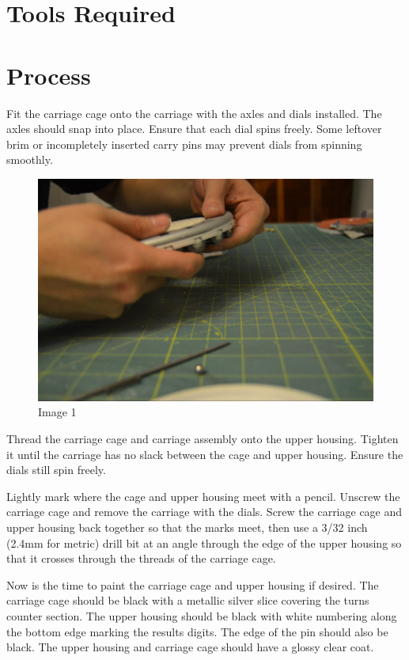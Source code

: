 \documentclass[openany]{book}
\begin{document}
\section{Tools Required}

\section{Process}
Fit the carriage cage onto the carriage with the axles and dials installed. The axles should snap into place. Ensure that each dial spins freely. Some leftover brim or incompletely inserted carry pins may prevent dials from spinning smoothly.


\begin{figure}[!ht]
	\centering
	\includegraphics[width=.75\textwidth]{images/image1.jpg}
	\caption{Image 1}
	\label{fig:image1}	
\end{figure}

Thread the carriage cage and carriage assembly onto the upper housing. Tighten it until the carriage has no slack between the cage and upper housing. Ensure the dials still spin freely.

Lightly mark where the cage and upper housing meet with a pencil. Unscrew the carriage cage and remove the carriage with the dials. Screw the carriage cage and upper housing back together so that the marks meet, then use a 3/32 inch (2.4mm for metric) drill bit at an angle through the edge of the upper housing so that it crosses through the threads of the carriage cage.

Now is the time to paint the carriage cage and upper housing if desired. The carriage cage should be black with a metallic silver slice covering the turns counter section. The upper housing should be black with white numbering along the bottom edge marking the results digits. The edge of the pin should also be black. The upper housing and carriage cage should have a glossy clear coat.
\end{document}
